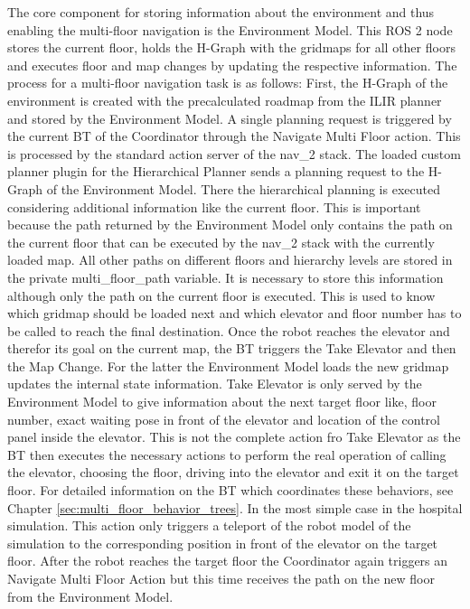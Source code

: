 The core component for storing information about the environment and thus enabling the multi-floor navigation is the Environment Model. This ROS 2 node stores the current floor, holds the H-Graph with the gridmaps for all other floors and executes floor and map changes by updating the respective information. The process for a multi-floor navigation task is as follows: First, the H-Graph of the environment is created with the precalculated roadmap from the ILIR planner and stored by the Environment Model. A single planning request is triggered by the current BT of the Coordinator through the Navigate Multi Floor action. This is processed by the standard action server of the \gls{nav_2} stack. The loaded custom planner plugin for the Hierarchical Planner sends a planning request to the H-Graph of the Environment Model. There the hierarchical planning is executed considering additional information like the current floor. This is important because the path returned by the Environment Model only contains the path on the current floor that can be executed by the \gls{nav_2} stack with the currently loaded map. All other paths on different floors and hierarchy levels are stored in the private multi\_floor\_path variable. It is necessary to store this information although only the path on the current floor is executed. This is used to know which gridmap should be loaded next and which elevator and floor number has to be called to reach the final destination. Once the robot reaches the elevator and therefor its goal on the current map, the BT triggers the Take Elevator and then the Map Change. For the latter the Environment Model loads the new gridmap updates the internal state information. Take Elevator is only served by the Environment Model to give information about the next target floor like, floor number, exact waiting pose in front of the elevator and location of the control panel inside the elevator. This is not the complete action fro Take Elevator as the BT then executes the necessary actions to perform the real operation of calling the elevator, choosing the floor, driving into the elevator and exit it on the target floor. For detailed information on the BT which coordinates these behaviors, see Chapter \ref{sec:multi_floor_behavior_trees}. In the most simple case in the hospital simulation. This action only triggers a teleport of the robot model of the simulation to the corresponding position in front of the elevator on the target floor. After the robot reaches the target floor the Coordinator again triggers an Navigate Multi Floor Action but this time receives the path on the new floor from the Environment Model.

